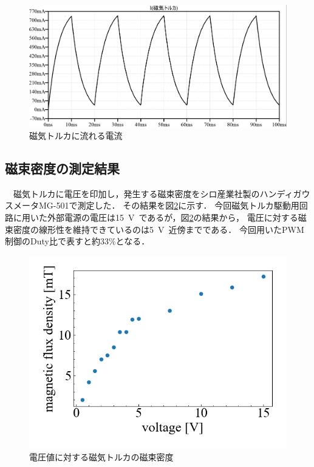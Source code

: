 \begin{figure}[H]
	\centering
		\includegraphics[scale=0.25]{./figure/50current.png}
		\caption{磁気トルカに流れる電流}
		\label{fig:current50}
\end{figure}

\subsection{磁束密度の測定結果}

　磁気トルカに電圧を印加し，発生する磁束密度をシロ産業社製のハンディガウスメータMG-501で測定した．
その結果を図\ref{fig:magnetic_flux_density}に示す．
今回磁気トルカ駆動用回路に用いた外部電源の電圧は15~V~であるが，図\ref{fig:magnetic_flux_density}の結果から，
電圧に対する磁束密度の線形性を維持できているのは5~V~近傍までである．
今回用いたPWM制御のDuty比で表すと約33\%となる．

\begin{figure}[H]
	\centering
		\includegraphics[scale=0.45]{./figure/figure.png}
		\caption{電圧値に対する磁気トルカの磁束密度}
		\label{fig:magnetic_flux_density}
\end{figure}